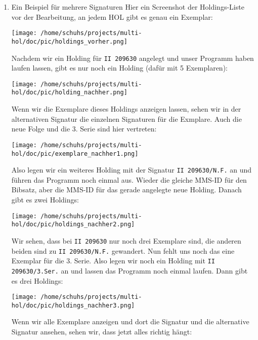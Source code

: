 \documentclass[10pt, a4paper]{scrartcl}
\begin{document}
\begin{enumerate}
\item Ein Beispiel für mehrere Signaturen
\label{sec:orgcb3a6a4}
Hier ein Screenshot der Holdings-Liste vor der Bearbeitung, an jedem HOL
gibt es genau ein Exemplar:

\begin{center}
\texttt{[image: /home/schuhs/projects/multi-hol/doc/pic/holdings\_vorher.png]}
\end{center}

Nachdem wir ein Holding für \texttt{II 209630} angelegt und unser Programm haben
laufen lassen, gibt es nur noch ein Holding (dafür mit 5 Exemplaren):
\begin{center}
\texttt{[image: /home/schuhs/projects/multi-hol/doc/pic/holding\_nachher.png]}
\end{center}

Wenn wir die Exemplare dieses Holdings anzeigen lassen, sehen wir in der
alternativen Signatur die einzelnen Signaturen für die Exmplare. Auch die
neue Folge und die 3. Serie sind hier vertreten:

\begin{center}
\texttt{[image: /home/schuhs/projects/multi-hol/doc/pic/exemplare\_nachher1.png]}
\end{center}

Also legen wir ein weiteres Holding mit der Signatur \texttt{II 209630/N.F.} an
und führen das Programm noch einmal aus. Wieder die gleiche MMS-ID für den
Bibsatz, aber die MMS-ID für das gerade angelegte neue Holding. Danach
gibt es zwei Holdings:

\begin{center}
\texttt{[image: /home/schuhs/projects/multi-hol/doc/pic/holdings\_nachher2.png]}
\end{center}

Wir sehen, dass bei \texttt{II 209630} nur noch drei Exemplare sind, die anderen
beiden sind zu \texttt{II 209630/N.F.} gewandert. Nun fehlt uns noch das eine
Exemplar für die 3. Serie. Also legen wir noch ein Holding mit \texttt{II
        209630/3.Ser.} an und lassen das Programm noch einmal laufen. Dann gibt es
drei Holdings:

\begin{center}
\texttt{[image: /home/schuhs/projects/multi-hol/doc/pic/holdings\_nachher3.png]}
\end{center}

Wenn wir alle Exemplare anzeigen und dort die Signatur und die alternative
Signatur ansehen, sehen wir, dass jetzt alles richtig hängt:


\end{enumerate}
\end{document}
